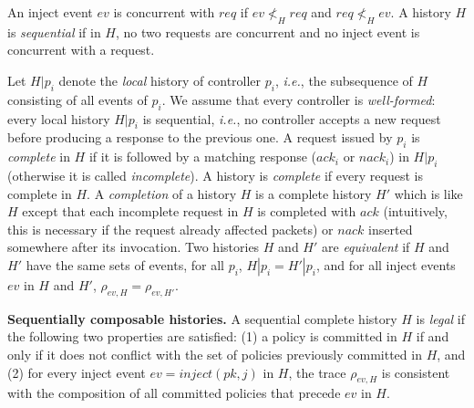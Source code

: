 \documentclass[11pt,pdftex,letter]{article}
\newcommand{\dom}{\textit{dom}}
\newcommand{\ie}{{\it i.e.}}
\newcommand{\ssnote}[1]{\textcolor{heraldBlue}{\small \bf [SS: #1]}}
\newcommand{\ssnote}[1]{}
\newcommand{\ack}{\textit{ack}}
\newcommand{\nack}{\textit{nack}}
\begin{document}
An inject event $ev$ is concurrent with
$\textit{req}$ if $ev \not<_H \textit{req}$ and $\textit{req} \not<_H ev$.
A history $H$ is \emph{sequential} if in $H$, no two requests are
concurrent and no inject event is concurrent with a request.

Let $H|p_i$ denote the \emph{local} history
of controller $p_i$, \ie, the subsequence of $H$ consisting of all events
of $p_i$.
We assume that every controller is \emph{well-formed}:
every local history $H|p_i$ is sequential, \ie,
no controller accepts a new request before producing a response to the
previous one.
A request issued by $p_i$ is \emph{complete} in $H$ if it is followed by a
matching response ($\ack_i$ or $\nack_i$) in $H|p_i$ (otherwise it is
called \emph{incomplete}).
A history is \emph{complete} if every request is complete in $H$.
A \emph{completion} of a history $H$ is a complete history $H'$ which is like
$H$ except that  each incomplete request in $H$
is completed with $\ack$ (intuitively, this is necessary if the
request already affected packets) or $\nack$ inserted
somewhere after its invocation.
%
Two histories $H$ and $H'$ are \emph{equivalent} if $H$ and $H'$ have
the same sets of events,  for all $p_i$, $H|p_i=H'|p_i$, and for all
inject events $ev$ in $H$ and $H'$, $\rho_{ev,H}=\rho_{ev,H'}$.


\vspace{1mm}\noindent\textbf{Sequentially composable histories.}
A sequential complete history $H$ is \emph{legal} if the following two
properties are satisfied:
(1) a policy
is committed in $H$ if and only if
it does not conflict with the set of
policies previously committed in $H$, and
(2) for every inject event
$ev=\textit{inject}(pk,j)$ in $H$,  the trace $\rho_{ev,H}$  is consistent
with the composition of all committed policies that precede
$ev$ in $H$.

\end{document}
